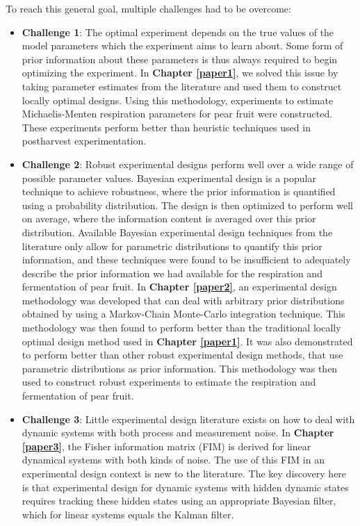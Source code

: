 	To reach this general goal, multiple challenges had to be overcome:
	\begin{itemize}
		\item \textbf{Challenge 1}: The optimal experiment depends on the true values of the model parameters which the experiment aims to learn about. Some form of prior information about these parameters is thus always required to begin optimizing the experiment. In \textbf{Chapter \ref{paper1}}, we solved this issue by taking parameter estimates from the literature and used them to construct locally optimal designs. Using this methodology, experiments to estimate Michaelis-Menten respiration parameters for pear fruit were constructed. These experiments perform better than heuristic techniques used in postharvest experimentation.
		\item \textbf{Challenge 2}: Robust experimental designs perform well over a wide range of possible parameter values. Bayesian experimental design is a popular technique to achieve robustness, where the prior information is quantified using a probability distribution. The design is then optimized to perform well on average, where the information content is averaged over this prior distribution. Available Bayesian experimental design techniques from the literature only allow for parametric distributions to quantify this prior information, and these techniques were found to be insufficient to adequately describe the prior information we had available for the respiration and fermentation of pear fruit. In \textbf{Chapter \ref{paper2}}, an experimental design methodology was developed that can deal with arbitrary prior distributions obtained by using a Markov-Chain Monte-Carlo integration technique. This methodology was then found to perform better than the traditional locally optimal design method used in \textbf{Chapter \ref{paper1}}. {\color{red}It was also demonstrated to perform better than other robust experimental design methods, that use parametric distributions as prior information.} This methodology was then used to construct robust experiments to estimate the respiration and fermentation of pear fruit.
		\item \textbf{Challenge 3}: Little experimental design literature exists on how to deal with dynamic systems with both process and measurement noise. In \textbf{Chapter \ref{paper3}}, the Fisher information matrix (FIM) is derived for linear dynamical systems with both kinds of noise. {\color{red}The use of this FIM in an experimental design context is new to the literature}. The key discovery here is that experimental design for dynamic systems with hidden dynamic states requires tracking these hidden states using an appropriate Bayesian filter, which for linear systems equals the Kalman filter.  

\end{itemize}
